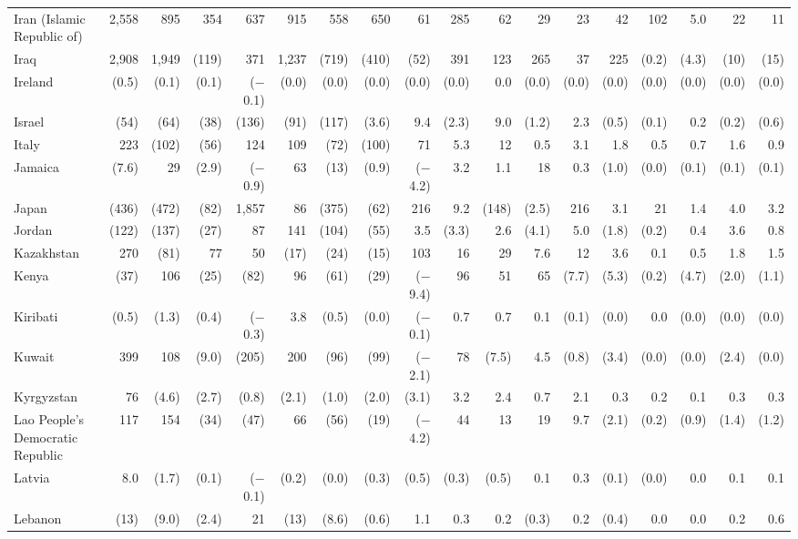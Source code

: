 \begin{longtable}{lrrrrrrrrrrrrrrrrr}
Iran (Islamic Republic of) & 2,558 & 895 & 354 & 637 & 915 & 558 & 650 & 61 & 285 & 62 & 29 & 23 & 42 & 102 & 5.0 & 22 & 11 \\
Iraq & 2,908 & 1,949 & (119) & 371 & 1,237 & (719) & (410) & (52) & 391 & 123 & 265 & 37 & 225 & (0.2) & (4.3) & (10) & (15) \\
Ireland & (0.5) & (0.1) & (0.1) & ($-$0.1) & (0.0) & (0.0) & (0.0) & (0.0) & (0.0) & 0.0 & (0.0) & (0.0) & (0.0) & (0.0) & (0.0) & (0.0) & (0.0) \\
Israel & (54) & (64) & (38) & (136) & (91) & (117) & (3.6) & 9.4 & (2.3) & 9.0 & (1.2) & 2.3 & (0.5) & (0.1) & 0.2 & (0.2) & (0.6) \\
Italy & 223 & (102) & (56) & 124 & 109 & (72) & (100) & 71 & 5.3 & 12 & 0.5 & 3.1 & 1.8 & 0.5 & 0.7 & 1.6 & 0.9 \\
Jamaica & (7.6) & 29 & (2.9) & ($-$0.9) & 63 & (13) & (0.9) & ($-$4.2) & 3.2 & 1.1 & 18 & 0.3 & (1.0) & (0.0) & (0.1) & (0.1) & (0.1) \\
Japan & (436) & (472) & (82) & 1,857 & 86 & (375) & (62) & 216 & 9.2 & (148) & (2.5) & 216 & 3.1 & 21 & 1.4 & 4.0 & 3.2 \\
Jordan & (122) & (137) & (27) & 87 & 141 & (104) & (55) & 3.5 & (3.3) & 2.6 & (4.1) & 5.0 & (1.8) & (0.2) & 0.4 & 3.6 & 0.8 \\
Kazakhstan & 270 & (81) & 77 & 50 & (17) & (24) & (15) & 103 & 16 & 29 & 7.6 & 12 & 3.6 & 0.1 & 0.5 & 1.8 & 1.5 \\
Kenya & (37) & 106 & (25) & (82) & 96 & (61) & (29) & ($-$9.4) & 96 & 51 & 65 & (7.7) & (5.3) & (0.2) & (4.7) & (2.0) & (1.1) \\
Kiribati & (0.5) & (1.3) & (0.4) & ($-$0.3) & 3.8 & (0.5) & (0.0) & ($-$0.1) & 0.7 & 0.7 & 0.1 & (0.1) & (0.0) & 0.0 & (0.0) & (0.0) & (0.0) \\
Kuwait & 399 & 108 & (9.0) & (205) & 200 & (96) & (99) & ($-$2.1) & 78 & (7.5) & 4.5 & (0.8) & (3.4) & (0.0) & (0.0) & (2.4) & (0.0) \\
Kyrgyzstan & 76 & (4.6) & (2.7) & (0.8) & (2.1) & (1.0) & (2.0) & (3.1) & 3.2 & 2.4 & 0.7 & 2.1 & 0.3 & 0.2 & 0.1 & 0.3 & 0.3 \\
Lao People's Democratic Republic & 117 & 154 & (34) & (47) & 66 & (56) & (19) & ($-$4.2) & 44 & 13 & 19 & 9.7 & (2.1) & (0.2) & (0.9) & (1.4) & (1.2) \\
Latvia & 8.0 & (1.7) & (0.1) & ($-$0.1) & (0.2) & (0.0) & (0.3) & (0.5) & (0.3) & (0.5) & 0.1 & 0.3 & (0.1) & (0.0) & 0.0 & 0.1 & 0.1 \\
Lebanon & (13) & (9.0) & (2.4) & 21 & (13) & (8.6) & (0.6) & 1.1 & 0.3 & 0.2 & (0.3) & 0.2 & (0.4) & 0.0 & 0.0 & 0.2 & 0.6 \\

\end{longtable}
